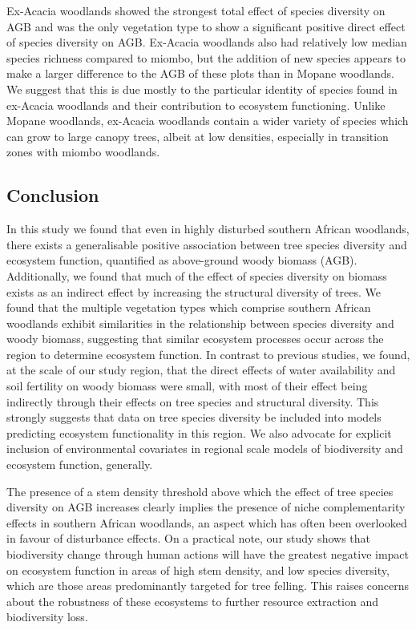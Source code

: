 \documentclass[11pt,a4paper]{article}
\begin{document}
Ex-Acacia woodlands showed the strongest total effect of species diversity on AGB and was the only vegetation type to show a significant positive direct effect of species diversity on AGB. Ex-Acacia woodlands also had relatively low median species richness compared to miombo, but the addition of new species appears to make a larger difference to the AGB of these plots than in Mopane woodlands. We suggest that this is due mostly to the particular identity of species found in ex-Acacia woodlands and their contribution to ecosystem functioning. Unlike Mopane woodlands, ex-Acacia woodlands contain a wider variety of species which can grow to large canopy trees, albeit at low densities, especially in transition zones with miombo woodlands. 

\subsection{Conclusion}

In this study we found that even in highly disturbed southern African woodlands, there exists a generalisable positive association between tree species diversity and ecosystem function, quantified as above-ground woody biomass (AGB). Additionally, we found that much of the effect of species diversity on biomass exists as an indirect effect by increasing the structural diversity of trees. We found that the multiple vegetation types which comprise southern African woodlands exhibit similarities in the relationship between species diversity and woody biomass, suggesting that similar ecosystem processes occur across the region to determine ecosystem function. In contrast to previous studies, we found, at the scale of our study region, that the direct effects of water availability and soil fertility on woody biomass were small, with most of their effect being indirectly through their effects on tree species and structural diversity. This strongly suggests that data on tree species diversity be included into models predicting ecosystem functionality in this region. We also advocate for explicit inclusion of environmental covariates in regional scale models of biodiversity and ecosystem function, generally. 

The presence of a stem density threshold above which the effect of tree species diversity on AGB increases clearly implies the presence of niche complementarity effects in southern African woodlands, an aspect which has often been overlooked in favour of disturbance effects. On a practical note, our study shows that biodiversity change through human actions will have the greatest negative impact on ecosystem function in areas of high stem density, and low species diversity, which are those areas predominantly targeted for tree felling. This raises concerns about the robustness of these ecosystems to further resource extraction and biodiversity loss. 
\end{document}
